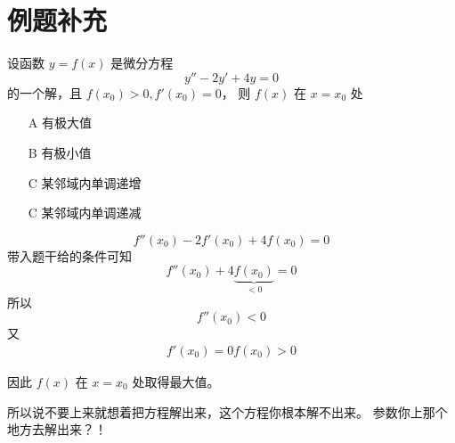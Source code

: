 \section{例题补充}

\begin{example}
    设函数 $y = f(x)$ 是微分方程 
    \[
        y'' - 2 y' + 4y = 0
    \]
    的一个解，且 $f(x_0) > 0, f'(x_0) = 0$，
    则 $f(x)$ 在 $x = x_0$ 处
    \begin{enumerate}
        \item[A] 有极大值
        \item[B] 有极小值
        \item[C] 某邻域内单调递增 
        \item[C] 某邻域内单调递减
    \end{enumerate}

    \[
        f''(x_0) - 2f'(x_0) + 4f(x_0) = 0
    \]
    带入题干给的条件可知
    \[
        f''(x_0) + 4\underbrace{f(x_0)}_{<0} = 0
    \]
    所以
    \[
        f''(x_0) < 0
    \]
    又
    \begin{gather*}
        f'(x_0) = 0
        f(x_0) > 0
    \end{gather*}

    因此 $f(x)$ 在 $x = x_0$ 处取得最大值。
\end{example}

所以说不要上来就想着把方程解出来，这个方程你根本解不出来。
参数你上那个地方去解出来？！


